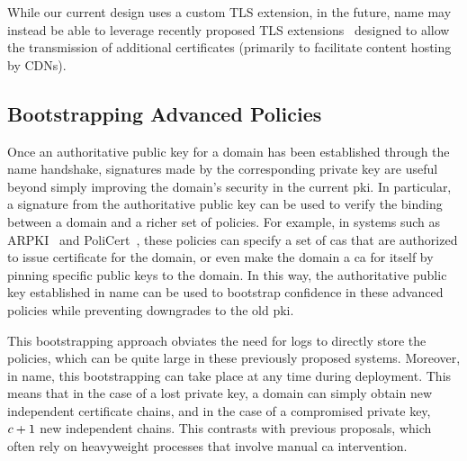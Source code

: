 While our current design uses a custom TLS extension, in the future, \ac{name}
may instead be able to leverage recently proposed TLS
extensions~\cite{rfc-extra-cert-1, rfc-extra-cert-2} designed to allow the
transmission of additional certificates (primarily to facilitate content hosting
by CDNs).  

\subsection{Bootstrapping Advanced Policies}
\label{sec:design:bootstrapping}

Once an authoritative public key for a domain has been established through the
\ac{name} handshake, signatures made by the corresponding private key are useful 
beyond simply improving the domain's security in the current \ac{pki}.
In particular, a signature from the authoritative public key can be
used to verify the binding between a domain and a richer set of policies. For
example, in systems such as ARPKI~\cite{basin2014arpki} and
PoliCert~\cite{szalachowski2014policert}, these policies can specify a set of
\acp{ca} that are authorized to issue certificate for the domain, or even make
the domain a \ac{ca} for itself by pinning specific public keys to the domain.
In this way, the authoritative public key established in \ac{name} can be used
to bootstrap confidence in these advanced policies while preventing downgrades
to the old \ac{pki}.

This bootstrapping approach obviates the need for logs to directly store the
policies, which can be quite large in these previously proposed systems.
Moreover, in \ac{name}, this bootstrapping can take place at any time during
deployment. This means that in the case of a lost private key, a domain can
simply obtain \policy new independent certificate chains, and in the case of a
compromised private key, $c + 1$ new independent chains. This contrasts
with previous proposals, which often rely on heavyweight processes that involve
manual \ac{ca} intervention.

